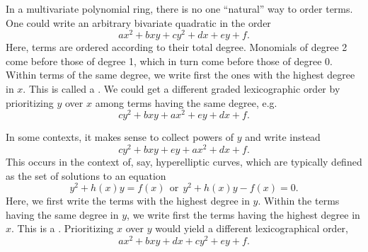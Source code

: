 In a multivariate polynomial ring, there is no one ``natural'' way to order terms.
One could write an arbitrary bivariate quadratic in the order
  \[ ax^2 + bxy + cy^2 + dx + ey + f. \]
Here, terms are ordered according to their total degree.
Monomials of degree 2 come before those of degree 1, which in turn come before those of degree 0.
Within terms of the same degree, we write first the ones with the highest degree in $x$.
This is called a .
We could get a different graded lexicographic order by prioritizing $y$ over $x$ among terms having the same degree, e.g.
  \[ cy^2 + bxy + ax^2 + ey + dx + f. \]

In some contexts, it makes sense to collect powers of $y$ and write instead
  \[ cy^2 + bxy + ey + ax^2 + dx + f. \]
This occurs in the context of, say, hyperelliptic curves, which are typically defined as the set of solutions to an equation
  \[ y^2 + h(x)y = f(x) ~~\text{or}~~ y^2 + h(x)y - f(x) = 0. \]
Here, we first write the terms with the highest degree in $y$.
Within the terms having the same degree in $y$, we write first the terms having the highest degree in $x$.
This is a .
Prioritizing $x$ over $y$ would yield a different lexicographical order,
  \[ ax^2 + bxy + dx + cy^2 + ey + f. \]

